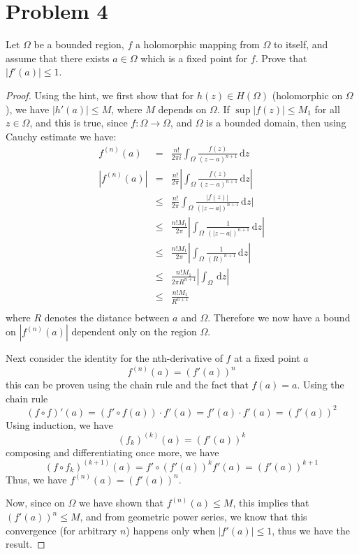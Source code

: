 \documentclass{article}[12pt]
\def\D{\mathrm{d}}
\begin{document}
\section*{Problem 4} Let $\Omega$ be a bounded region, $f$
a holomorphic mapping from $\Omega$ to itself, and assume that
there exists $a\in\Omega$ which is a fixed point for $f$.
Prove that $|f'(a)|\le 1$.
\begin{proof}
Using the hint, we first show that for $h(z)\in H(\Omega)$ 
(holomorphic on $\Omega$), we have $|h'(a)|\le M$, where $M$
depends on $\Omega$. If $\sup |f(z)| \le M_1$
for all $z \in \Omega$, and this is true, since $f:\Omega\to\Omega$, and
$\Omega$ is a bounded domain, then using Cauchy estimate we have:
\begin{eqnarray}
f^{(n)}(a) & = & \frac{n!}{2\pi i}\int_\Omega \frac{f(z)}{(z-a)^{n+1}}\, \D z \nonumber \\
|f^{(n)}(a)| & = & \frac{n!}{2\pi }|\int_\Omega \frac{f(z)}{(z-a)^{n+1}}\, \D z |\nonumber \\
& \le & \frac{n!}{2\pi }\int_\Omega \frac{|f(z)|}{(|z-a|)^{n+1}}\, \D z |\nonumber \\
& \le & \frac{n!M_1}{2\pi} |\int_\Omega \frac{1}{(|z-a|)^{n+1}}\, \D z |\nonumber \\
& \le & \frac{n!M_1}{2\pi} |\int_\Omega \frac{1}{(R)^{n+1}}\, \D z |\nonumber \\ 
& \le & \frac{n!M_1}{2\pi R^{n+1}} |\int_\Omega \, \D z |\nonumber \\ 
& \le & \frac{n!M_1}{R^{n+1}} \nonumber \\ 
\end{eqnarray}
where $R$ denotes the distance between $a$ and $\Omega$. Therefore we now have
a bound on $|f^{(n)}(a)|$ dependent only on the region $\Omega$.

Next consider the identity for the nth-derivative of $f$ at a fixed point $a$
\[
f^{(n)}(a) = (f'(a))^n
\]
this can be proven using the chain rule and the fact that $f(a)=a$.
Using the chain rule 
\[
(f\circ f)'(a) = (f'\circ f(a))\cdot f'(a)=f'(a)\cdot f'(a) = (f'(a))^2
\]
Using induction, we have
\[
(f_k)^{(k)}(a) = (f'(a))^k
\]
composing and differentiating once more, we have
\[
(f\circ f_k)^{(k+1)}(a) = f'\circ (f'(a))^k f'(a) = (f'(a))^{k+1}
\]
Thus, we have $f^{(n)}(a)=(f'(a))^n$.

Now, since on $\Omega$ we have shown that $f^{(n)}(a) \le M$, this
implies that $(f'(a))^n \le M$, and from geometric power series, we know
that this convergence (for arbitrary $n$) 
happens only when $|f'(a)|\le 1$, thus we have
the result.
\end{proof}
\end{document}
